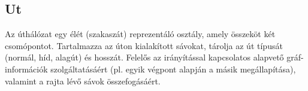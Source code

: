 \subsection{Ut}
\begin{class-template-responsibility}
    Az úthálózat egy élét (szakaszát) reprezentáló osztály, amely összeköt két csomópontot. Tartalmazza az úton kialakított sávokat, tárolja az út típusát (normál, híd, alagút) és hosszát. Felelős az irányítással kapcsolatos alapvető gráf-információk szolgáltatásáért (pl. egyik végpont alapján a másik megállapítása), valamint a rajta lévő sávok összefogásáért.
\end{class-template-responsibility}
\begin{class-template-attribute}
\end{class-template-attribute}
